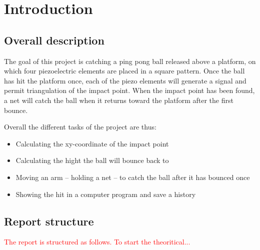 \chapter{Introduction}
\label{chap:introduction}

	\section{Overall description}
	\label{sec:overallDescription}
		The goal of this project is catching a ping pong ball released above a platform, on which four piezoelectric elements are placed in a square pattern. Once the ball has hit the platform once, each of the piezo elements will generate a signal and permit triangulation of the impact point. When the impact point has been found, a net will catch the ball when it returns toward the platform after the first bounce.

		Overall the different tasks of the project are thus:
		\begin{itemize}
			\item Calculating the xy-coordinate of the impact point
			\item Calculating the hight the ball will bounce back to
			\item Moving an arm -- holding a net -- to catch the ball after it has bounced once
			\item Showing the hit in a computer program and save a history
		\end{itemize}


	\section{Report structure}
	\label{sec:reportStructure}
		\textcolor{red}{The report is structured as follows. To start the theoritical...}